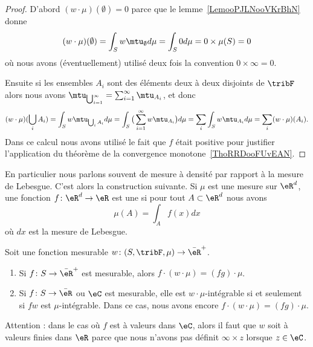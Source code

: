 \begin{proof}
    D'abord \( (w\cdot \mu)(\emptyset)=0\) parce que le lemme~\ref{LemooPJLNooVKrBhN} donne
    \begin{equation}
        (w\cdot \mu)(\emptyset)=\int_Sw\mtu_{\emptyset}d\mu=\int_S0d\mu=0\times \mu(S)=0
    \end{equation}
    où nous avons (éventuellement) utilisé deux fois la convention \( 0\times \infty=0\).


    Ensuite si les ensembles \( A_i\) sont des éléments deux à deux disjoints de \( \tribF\) alors nous avons \( \mtu_{\bigcup_{i=1}^{\infty}}=\sum_{i=1}^{\infty}\mtu_{A_i}\), et donc
    \begin{equation}
        (w\cdot \mu)(\bigcup_iA_i)=\int_Sw\mtu_{\bigcup_iA_i}d\mu=\int_S\big( \sum_{i=1}^{\infty}w\mtu_{A_i} \big)d\mu=\sum_i\int_Sw\mtu_{A_i}d\mu=\sum_i(w\cdot\mu)(A_i).
    \end{equation}
    Dans ce calcul nous avons utilisé le fait que \( f\) était positive pour justifier l'application du théorème de la convergence monotone~\ref{ThoRRDooFUvEAN}.
\end{proof}

En particulier nous parlons souvent de mesure à densité par rapport à la mesure de Lebesgue. C'est alors la construction suivante. Si \( \mu\) est une mesure sur \( \eR^d\), une fonction \( f\colon \eR^d\to \eR\) est une  si pour tout \( A\subset\eR^d\) nous avons
\begin{equation}
    \mu(A)=\int_Af(x)dx
\end{equation}
où \( dx\) est la mesure de Lebesgue.

\begin{proposition}  \label{PropooJMWAooDzfpmB}
    Soit une fonction mesurable \( w\colon (S,\tribF,\mu)\to \bar \eR^+\).
    \begin{enumerate}
        \item
            Si $f\colon S\to \bar\eR^+$ est mesurable, alors \( f\cdot(w\cdot \mu)=(fg)\cdot \mu\).
        \item
            Si \( f\colon S\to \bar \eR\) ou \( \eC\) est mesurable, elle est \( w\cdot\mu\)-intégrable si et seulement si \( fw\) est \( \mu\)-intégrable. Dans ce cas, nous avons encore \( f\cdot(w\cdot \mu)=(fg)\cdot\mu\).
    \end{enumerate}
    Attention : dans le cas où \( f\) est à valeurs dans \( \eC\), alors il faut que \( w\) soit à valeurs finies dans \( \eR\) parce que nous n'avons pas définit \( \infty\times z\) lorsque \( z\in \eC\).
\end{proposition}

